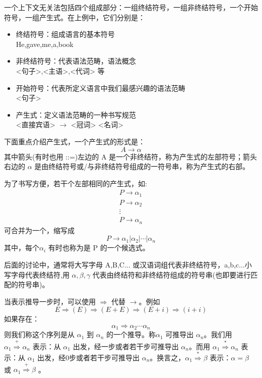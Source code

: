 一个上下文无关法包括四个组成部分：一组终结符号，一组非终结符号，一个开始符号，一组产生式。在上例中，它们分别是：

\begin{itemize}
    \item 终结符号：组成语言的基本符号 \\
    He,gave,me,a,book
    \item 非终结符号：代表语法范畴，语法概念 \\
    <句子>,<主语>,<代词> 等 
    \item 开始符号：代表所定义语言中我们最感兴趣的语法范畴 \\
    <句子>
    \item 产生式：定义语法范畴的一种书写规范\\
    <直接宾语> $\rightarrow$ <冠词> <名词>
\end{itemize}

下面重点介绍产生式，一个产生式的形式是：
\[A \rightarrow \alpha\]
其中箭头(有时也用 ::=)左边的 A 是一个非终结符，称为产生式的左部符号；箭头右边的 $\alpha$ 是由终结符号或/与非终结符号组成的一符号串，称为产生式的右部。

为了书写方便，若干个左部相同的产生式，如:
\begin{equation}
    \begin{aligned}
        P \rightarrow \alpha_1 \\
        P \rightarrow \alpha_2 \\
        \vdots \\
        P \rightarrow \alpha_n \nonumber
    \end{aligned}
\end{equation}
可合并为一个，缩写成
\[ P \rightarrow \alpha_1 | \alpha_2 | \cdots | \alpha_n \]
其中，每个$\alpha_i$ 有时也称为是 P 的一个候选式。

后面的讨论中，通常将大写字母 A,B,C... 或汉语词组代表非终结符号，a,b,c...小写字母代表终结符,用 $\alpha,\beta,\gamma$ 代表由终结符和非终结符组成的符号串(也即要进行匹配的符号串)。

\textcolor{tip}{当表示推导一步时，可以使用 $\Rightarrow$ 代替 $\rightarrow$}。例如 
\[ E \Rightarrow (E) \Rightarrow (E+E) \Rightarrow (E+i) \Rightarrow (i+i) \]
如果存在：
\[ \alpha_1 \Rightarrow \alpha_2 \cdots \alpha_n \]
则我们称这个序列是从 $\alpha_1$ 到 $\alpha_n$ 的一个推导。称$\alpha_1$ 可推导出 $\alpha_n$。我们用 $\alpha_1 \stackrel{+}{\Rightarrow} \alpha_n$ 表示：从 $\alpha_1$ 出发，\textcolor{tip}{经一步或者若干步}可推导出 $\alpha_n$。而用 $\alpha_1 \stackrel{*}{\Rightarrow} \alpha_n$ 表示：从 $\alpha_1$ 出发，\textcolor{tip}{经0步或者若干步}可推导出 $\alpha_n$。换言之，$\alpha_1 \stackrel{*}{\Rightarrow} \beta$ 表示：$\alpha = \beta$ 或 $\alpha_1 \stackrel{+}{\Rightarrow} \beta$ 。

